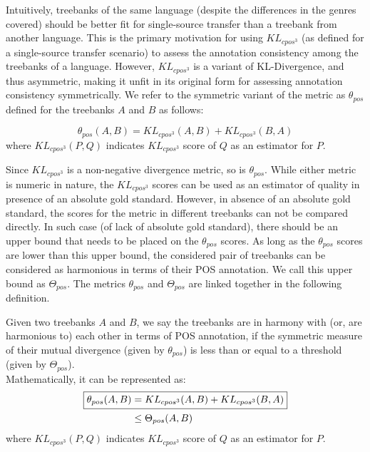 Intuitively, treebanks of the same language (despite the differences in the genres covered) should be better fit for single-source transfer than a treebank from another language. This is the primary motivation for using $KL_{cpos^3}$ (as defined for a single-source transfer scenario) to assess the annotation consistency among the treebanks of a language. However, $KL_{cpos^3}$ is a variant of KL-Divergence, and thus asymmetric, making it unfit in its original form for assessing annotation consistency symmetrically. We refer to the symmetric variant of the metric as $\theta_{pos}$ defined for the treebanks $A$ and $B$ as follows:

\begin{equation}
    \boxed{\theta_{pos}(A, B) = KL_{cpos^3}(A,B) + KL_{cpos^3}(B,A)}
\end{equation}
where $KL_{cpos^3}(P,Q)$ indicates $KL_{cpos^3}$ score of $Q$ as an estimator for $P$.

Since $KL_{cpos^3}$ is a non-negative divergence metric, so is $\theta_{pos}$. While either metric is numeric in nature, the $KL_{cpos^3}$ scores can be used as an estimator of quality in presence of an absolute gold standard. However, in absence of an absolute gold standard, the scores for the metric in different treebanks can not be compared directly. In such case (of lack of absolute gold standard), there should be an upper bound that needs to be placed on the $\theta_{pos}$ scores. As long as the $\theta_{pos}$ scores are lower than this upper bound, the considered pair of treebanks can be considered as harmonious in terms of their POS annotation. We call this upper bound as $\Theta_{pos}$. The metrics $\theta_{pos}$ and $\Theta_{pos}$ are linked together in the following definition.

\begin{definition}
\label{def:harmony}
Given two treebanks $A$ and $B$, we say the treebanks are in harmony with (or, are harmonious to) each other in terms of POS annotation, if the symmetric measure of their mutual divergence (given by $\theta_{pos}$) is less than or equal to a threshold (given by $\Theta_{pos}$). \\
    Mathematically, it can be represented as:
    \begin{align}
    \label{eq:pos_harmony}
        \Aboxed{\theta_{pos}(A, B) & = \nonumber KL_{cpos^3}(A,B) + KL_{cpos^3}(B,A)} \\
        &\leq \Theta_{pos}(A, B)
    \end{align}
    where $KL_{cpos^3}(P,Q)$ indicates $KL_{cpos^3}$ score of $Q$ as an estimator for $P$.
\end{definition}

